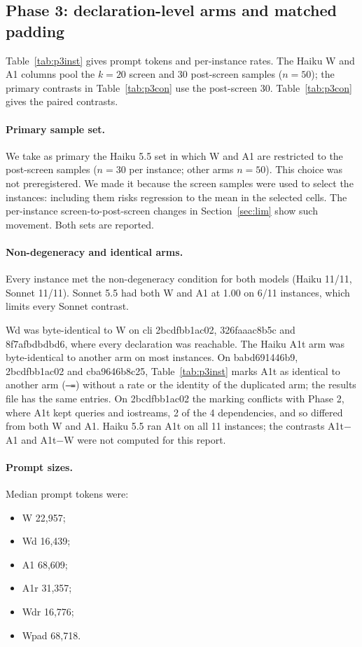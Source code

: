 \subsection{Phase 3: declaration-level arms and matched padding}

Table~\ref{tab:p3inst} gives prompt tokens and per-instance rates. The Haiku W and A1 columns pool the $k=20$ screen and 30 post-screen samples ($n=50$); the primary contrasts in Table~\ref{tab:p3con} use the post-screen 30. Table~\ref{tab:p3con} gives the paired contrasts.

\paragraph{Primary sample set.} We take as primary the Haiku 5.5 set in which W and A1 are restricted to the post-screen samples ($n=30$ per instance; other arms $n=50$). This choice was not preregistered. We made it because the screen samples were used to select the instances: including them risks regression to the mean in the selected cells. The per-instance screen-to-post-screen changes in Section~\ref{sec:lim} show such movement. Both sets are reported.

\paragraph{Non-degeneracy and identical arms.} Every instance met the non-degeneracy condition for both models (Haiku 11/11, Sonnet 11/11). Sonnet 5.5 had both W and A1 at 1.00 on 6/11 instances, which limits every Sonnet contrast.

Wd was byte-identical to W on cli 2bcdfbb1ac02, 326faaac8b5c and 8f7afbdbdbd6, where every declaration was reachable. The Haiku A1t arm was byte-identical to another arm on most instances. On babd691446b9, 2bcdfbb1ac02 and cba9646b8c25, Table~\ref{tab:p3inst} marks A1t as identical to another arm (\texttt{--=}) without a rate or the identity of the duplicated arm; the results file has the same entries. On 2bcdfbb1ac02 the marking conflicts with Phase 2, where A1t kept queries and iostreams, 2 of the 4 dependencies, and so differed from both W and A1. Haiku 5.5 ran A1t on all 11 instances; the contrasts A1t$-$A1 and A1t$-$W were not computed for this report.

\paragraph{Prompt sizes.} Median prompt tokens were:
\begin{itemize}
\item W 22,957;
\item Wd 16,439;
\item A1 68,609;
\item A1r 31,357;
\item Wdr 16,776;
\item Wpad 68,718.
\end{itemize}

